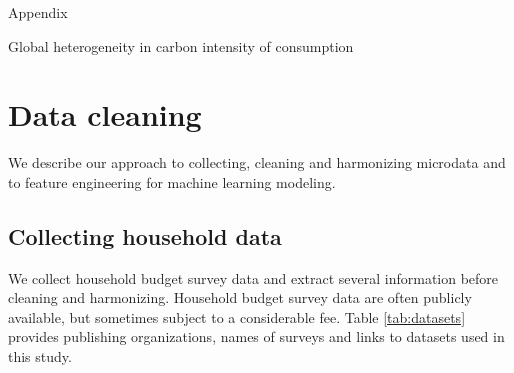 \documentclass[12pt, a4paper]{article}
\begin{document}
\clearpage

\begin{refcontext}[sorting=nyt]
\printbibliography
\end{refcontext}

\clearpage

\appendix 
\begin{refsection}
{\Huge Appendix} \label{sec:appendix}

Global heterogeneity in carbon intensity of consumption

\clearpage
\section{Data cleaning} \label{sec:cleaning}

We describe our approach to collecting, cleaning and harmonizing microdata and to feature engineering for machine learning modeling.

\subsection{Collecting household data}

We collect household budget survey data and extract several information before cleaning and harmonizing. Household budget survey data are often publicly available, but sometimes subject to a considerable fee. Table \ref{tab:datasets} provides publishing organizations, names of surveys and links to datasets used in this study.


\end{refsection}
\end{document}
